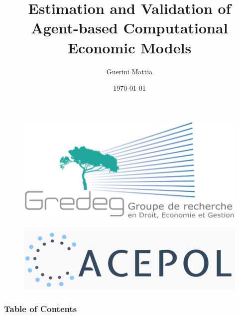\documentclass[10pt]{beamer}
\title{Estimation and Validation of \\ Agent-based Computational Economic Models}
\author{Guerini Mattia}
\institute{Université Côte d'Azur - GREDEG}
\date{\today}
\begin{document}
\begin{frame}
	\begin{figure}[htbp] \centering \hfill 
		\includegraphics[scale=.10]{logo/gredeg.png} ~
		\includegraphics[scale=.15]{logo/acepol.png} %
	\end{figure}

	\vspace{-2cm}
	\maketitle
\end{frame}


\begin{frame}[c]\frametitle{Table of Contents}
	\tableofcontents[hideallsubsections]
\end{frame}






\end{document}
